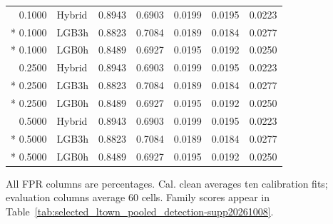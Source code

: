 \begin{longtable}{@{}rlrrrrr@{}}
0.1000 & Hybrid & 0.8943 & 0.6903 & 0.0199 & 0.0195 & 0.0223 \\*
0.1000 & LGB3h & 0.8823 & 0.7084 & 0.0189 & 0.0184 & 0.0277 \\*
0.1000 & LGB0h & 0.8489 & 0.6927 & 0.0195 & 0.0192 & 0.0250 \\
0.2500 & Hybrid & 0.8943 & 0.6903 & 0.0199 & 0.0195 & 0.0223 \\*
0.2500 & LGB3h & 0.8823 & 0.7084 & 0.0189 & 0.0184 & 0.0277 \\*
0.2500 & LGB0h & 0.8489 & 0.6927 & 0.0195 & 0.0192 & 0.0250 \\
0.5000 & Hybrid & 0.8943 & 0.6903 & 0.0199 & 0.0195 & 0.0223 \\*
0.5000 & LGB3h & 0.8823 & 0.7084 & 0.0189 & 0.0184 & 0.0277 \\*
0.5000 & LGB0h & 0.8489 & 0.6927 & 0.0195 & 0.0192 & 0.0250 \\
\end{longtable}
\noindent\footnotesize All FPR columns are percentages. Cal. clean averages ten calibration fits; evaluation columns average 60 cells. Family scores appear in Table~\ref{tab:selected_ltown_pooled_detection-supp20261008}.
\par\endgroup
